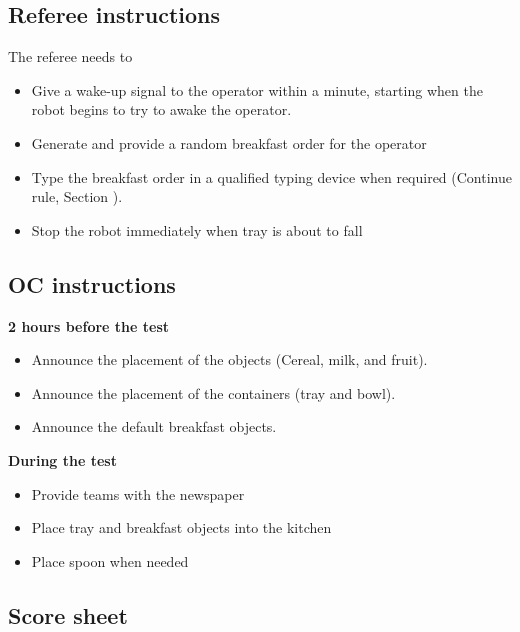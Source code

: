 \subsection{Referee instructions}

The referee needs to
\begin{itemize}
	\item Give a wake-up signal to the operator within a minute, starting when the robot begins to try to awake the operator.
	\item Generate and provide a random breakfast order for the operator
	\item Type the breakfast order in a qualified typing device when required (Continue rule, Section ).
	\item Stop the robot immediately when tray is about to fall
\end{itemize}

\subsection{OC instructions}

\textbf{2 hours before the test}
\begin{itemize}
	\item Announce the placement of the objects (Cereal, milk, and fruit).
	\item Announce the placement of the containers (tray and bowl).
	\item Announce the default breakfast objects.
\end{itemize}

\textbf{During the test}
\begin{itemize}
	\item Provide teams with the newspaper
	\item Place tray and breakfast objects into the kitchen
	\item Place spoon when needed
\end{itemize}

\newpage

\subsection{Score sheet}


